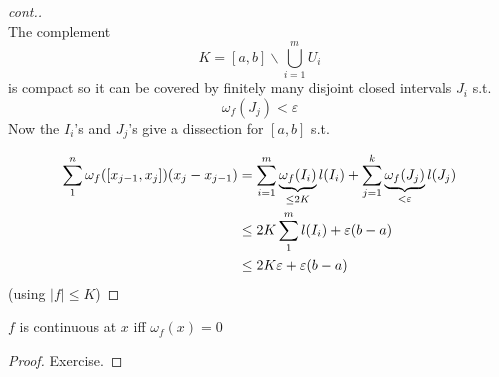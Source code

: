 \begin{lemma}[cont.]
\begin{proof}[cont.]
\begin{tikzpicture}[x=0.75pt,y=0.75pt,yscale=-1,xscale=1]
\end{tikzpicture}\\
The complement
\[K = [a,b] \backslash \bigcup_{i=1}^mU_i\]
is compact so it can be covered by finitely many disjoint closed intervals $J_i$ s.t.
\[\omega_f(J_j) < \varepsilon\]
Now the $I_i$'s and $J_j$'s give a dissection for $[a,b]$ s.t.

\begin{align*}
    \sum_1^n\omega_f([x_{j-1},x_j])(x_j - x_{j-1}) &= \s{m}\underbrace{\omega_f(I_i)}_{\leq 2K}l(I_i) + \s[j] k\underbrace{\omega_f(J_j)}_{<\varepsilon}l(J_j)\\
    &\leq 2K\sum_1^ml(I_i) + \varepsilon(b-a)\\
    &\leq 2K\varepsilon + \varepsilon(b-a) \
\end{align*}
(using $|f|\leq K$)
\end{proof}
\end{lemma}
\begin{lemma}
$f$ is continuous at $x$ iff $\omega_f(x) = 0$
\begin{proof}
Exercise.
\end{proof}
\end{lemma}
